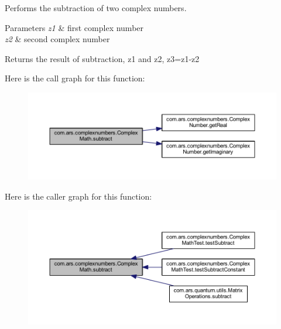 Performs the subtraction of two complex numbers. 
\begin{DoxyParams}{Parameters}
{\em z1} & first complex number \\
\hline
{\em z2} & second complex number \\
\hline
\end{DoxyParams}
\begin{DoxyReturn}{Returns}
the result of subtraction, z1 and z2, z3=z1-\/z2 
\end{DoxyReturn}
Here is the call graph for this function\+:
\nopagebreak
\begin{figure}[H]
\begin{center}
\leavevmode
\includegraphics[width=350pt]{classcom_1_1ars_1_1complexnumbers_1_1_complex_math_a2a8bfbcea23cec290cc91c8eeb9ab4fc_cgraph}
\end{center}
\end{figure}
Here is the caller graph for this function\+:
\nopagebreak
\begin{figure}[H]
\begin{center}
\leavevmode
\includegraphics[width=350pt]{classcom_1_1ars_1_1complexnumbers_1_1_complex_math_a2a8bfbcea23cec290cc91c8eeb9ab4fc_icgraph}
\end{center}
\end{figure}
\hypertarget{classcom_1_1ars_1_1complexnumbers_1_1_complex_math_a8ec234a476d41f2f32113eb13a0f7630}{}\label{classcom_1_1ars_1_1complexnumbers_1_1_complex_math_a8ec234a476d41f2f32113eb13a0f7630} 
